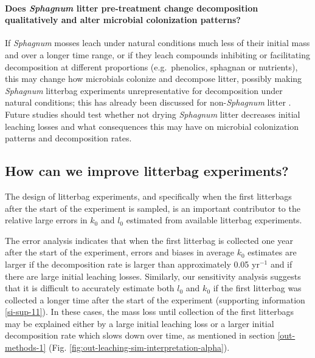 \documentclass[bg, manuscript]{copernicus}
\begin{document}
\paragraph*{\texorpdfstring{Does \emph{Sphagnum} litter pre-treatment change decomposition qualitatively and alter microbial colonization patterns?}{Does Sphagnum litter pre-treatment change decomposition qualitatively and alter microbial colonization patterns?}}

If \emph{Sphagnum} mosses leach under natural conditions much less of their initial mass and over a longer time range, or if they leach compounds inhibiting or facilitating decomposition at different proportions (e.g.~phenolics, sphagnan \citep{Fenner.2011, Hajek.2011, Hajek.2024} or nutrients), this may change how microbials colonize and decompose litter, possibly making \emph{Sphagnum} litterbag experiments unrepresentative for decomposition under natural conditions; this has already been discussed for non-\emph{Sphagnum} litter \citep{Barlocher.1997}. Future studies should test whether not drying \emph{Sphagnum} litter decreases initial leaching losses and what consequences this may have on microbial colonization patterns and decomposition rates.

\hypertarget{out-discussion-5}{%
\subsection{How can we improve litterbag experiments?}\label{out-discussion-5}}

The design of litterbag experiments, and specifically when the first litterbags after the start of the experiment is sampled, is an important contributor to the relative large errors in \(k_0\) and \(l_0\) estimated from available litterbag experiments.

The error analysis indicates that when the first litterbag is collected one year after the start of the experiment, errors and biases in average \(k_0\) estimates are larger if the decomposition rate is larger than approximately 0.05 yr\(^{-1}\) and if there are large initial leaching losses. Similarly, our sensitivity analysis suggests that it is difficult to accurately estimate both \(l_0\) and \(k_0\) if the first litterbag was collected a longer time after the start of the experiment (supporting information \ref{si-sup-11}). In these cases, the mass loss until collection of the first litterbags may be explained either by a large initial leaching loss or a larger initial decomposition rate which slows down over time, as mentioned in section \ref{out-methods-1} (Fig. \ref{fig:out-leaching-sim-interpretation-alpha}).
\end{document}
